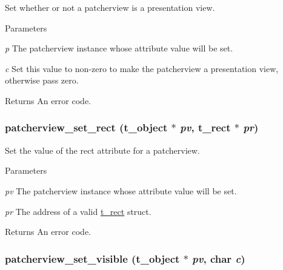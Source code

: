 Set whether or not a patcherview is a presentation view. 
\begin{DoxyParams}{Parameters}
\item[{\em p}]The patcherview instance whose attribute value will be set. \item[{\em c}]Set this value to non-\/zero to make the patcherview a presentation view, otherwise pass zero. \end{DoxyParams}
\begin{DoxyReturn}{Returns}
An error code. 
\end{DoxyReturn}
\hypertarget{group__jpatcherview_ga6025a5acb336aa81a0aad67e9de5bbca}{
\subsubsection[{patcherview\_\-set\_\-rect}]{ patcherview\_\-set\_\-rect ({\bf t\_\-object} $\ast$ {\em pv}, \/  {\bf t\_\-rect} $\ast$ {\em pr})}}
\label{group__jpatcherview_ga6025a5acb336aa81a0aad67e9de5bbca}


Set the value of the rect attribute for a patcherview. 
\begin{DoxyParams}{Parameters}
\item[{\em pv}]The patcherview instance whose attribute value will be set. \item[{\em pr}]The address of a valid \hyperlink{structt__rect}{t\_\-rect} struct. \end{DoxyParams}
\begin{DoxyReturn}{Returns}
An error code. 
\end{DoxyReturn}
\hypertarget{group__jpatcherview_gab8b3bb74c2341f42a1b8fb3a1dbdcbb8}{
\subsubsection[{patcherview\_\-set\_\-visible}]{ patcherview\_\-set\_\-visible ({\bf t\_\-object} $\ast$ {\em pv}, \/  char {\em c})}}
\label{group__jpatcherview_gab8b3bb74c2341f42a1b8fb3a1dbdcbb8}


